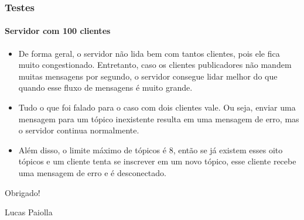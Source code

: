 \documentclass[10pt]{beamer}
\begin{document}
    \begin{frame}[t]
      \frametitle{Testes}
      \framesubtitle{Servidor com 100 clientes}
      \begin{itemize}
        \item De forma geral, o servidor não lida bem com tantos clientes, pois
          ele fica muito congestionado. Entretanto, caso os clientes
          publicadores não mandem muitas mensagens por segundo, o servidor
          consegue lidar melhor do que quando esse fluxo de mensagens é muito
          grande.
        \item Tudo o que foi falado para o caso com dois clientes vale. Ou seja,
          enviar uma mensagem para um tópico inexistente resulta em uma mensagem
          de erro, mas o servidor continua normalmente.
        \item Além disso, o limite máximo de tópicos é $8$, então se já existem
          esses oito tópicos e um cliente tenta se inscrever em um novo tópico,
          esse cliente recebe uma mensagem de erro e é desconectado.
      \end{itemize}
    \end{frame}

    \begin{frame}
        \centering
        {\huge Obrigado!}

        \nl

        Lucas Paiolla

    \end{frame}
\end{document}
